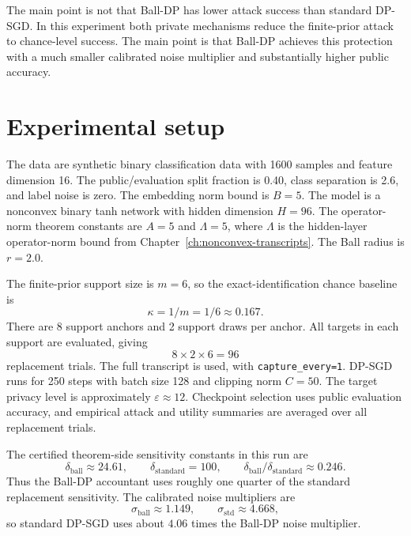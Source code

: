 \documentclass[11pt,a4paper]{report}
\theoremstyle{plain}
\theoremstyle{definition}
\theoremstyle{remark}
\begin{document}
The main point is not that Ball-DP has lower attack success than standard DP-SGD.  In this experiment both private mechanisms reduce the finite-prior attack to chance-level success.  The main point is that Ball-DP achieves this protection with a much smaller calibrated noise multiplier and substantially higher public accuracy.

\section{Experimental setup}
\label{sec:nonconvex-setup}

The data are synthetic binary classification data with 1600 samples and feature dimension 16.  The public/evaluation split fraction is 0.40, class separation is 2.6, and label noise is zero.  The embedding norm bound is $B=5$.  The model is a nonconvex binary tanh network with hidden dimension $H=96$.  The operator-norm theorem constants are $A=5$ and $\Lambda=5$, where $\Lambda$ is the hidden-layer operator-norm bound from Chapter~\ref{ch:nonconvex-transcripts}.  The Ball radius is $r=2.0$.

The finite-prior support size is $m=6$, so the exact-identification chance baseline is
\[
\kappa=1/m=1/6\approx0.167.
\]
There are 8 support anchors and 2 support draws per anchor.  All targets in each support are evaluated, giving
\[
8\times2\times6=96
\]
replacement trials.  The full transcript is used, with \texttt{capture\_every=1}.  DP-SGD runs for 250 steps with batch size 128 and clipping norm $C=50$.  The target privacy level is approximately $\varepsilon\approx12$.  Checkpoint selection uses public evaluation accuracy, and empirical attack and utility summaries are averaged over all replacement trials.

The certified theorem-side sensitivity constants in this run are
\[
\delta_{\mathrm{ball}}\approx24.61,
\qquad
\delta_{\mathrm{standard}}=100,
\qquad
\delta_{\mathrm{ball}}/\delta_{\mathrm{standard}}\approx0.246.
\]
Thus the Ball-DP accountant uses roughly one quarter of the standard replacement sensitivity.  The calibrated noise multipliers are
\[
\sigma_{\mathrm{ball}}\approx1.149,
\qquad
\sigma_{\mathrm{std}}\approx4.668,
\]
so standard DP-SGD uses about $4.06$ times the Ball-DP noise multiplier.
\end{document}

